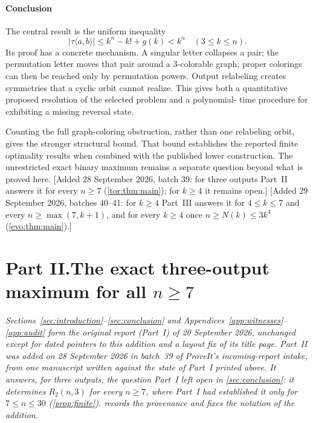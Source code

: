 \documentclass[11pt,a4paper]{article}
\numberwithin{equation}{section}
\theoremstyle{definition}
\theoremstyle{remark}
\begin{document}
\subsection{Conclusion}

The central result is the uniform inequality
\[
 \boxed{\ |\tau\langle a,b\rangle|\le k^n-k!+g(k)<k^n
          \quad(3\le k\le n).\ }
\]
Its proof has a concrete mechanism. A singular letter collapses a pair; the
permutation letter moves that pair around a $3$-colorable graph; proper
colorings can then be reached only by permutation powers. Output relabeling
creates symmetries that a cyclic orbit cannot realize. This gives both a
quantitative proposed resolution of the selected problem and a polynomial-
time procedure for exhibiting a missing reversal state.

Counting the full graph-coloring obstruction, rather than one relabeling
orbit, gives the stronger structural bound. That bound establishes the
reported finite optimality results when combined with the published lower
construction. The unrestricted exact binary maximum remains a separate
question beyond what is proved here.
[Added 28 September 2026, batch 39: for three outputs Part~II answers it for
every $n\ge7$ (\cref{tor:thm:main}); for $k\ge4$ it remains open.]
[Added 29 September 2026, batches 40--41: for $k\ge4$ Part~III answers it for $4\le k\le7$ and every
$n\ge\max(7,k+1)$, and for every $k\ge4$ once $n\ge N(k)\le3k^4$
(\cref{evo:thm:main}).]

\clearpage
{}\part*{Part II.\quad The exact three-output maximum for all $n\ge7$}

\noindent\emph{Sections~\ref{sec:introduction}--\ref{sec:conclusion} and
Appendices~\ref{app:witnesses}--\ref{app:audit} form the original report
(Part~I) of 20 September 2026, unchanged except for dated pointers to this
addition and a layout fix of its title page. Part~II was added on
28 September 2026 in batch~39 of ProveIt's incoming-report intake, from one
manuscript written against the state of Part~I printed above. It answers,
for three outputs, the question Part~I left open in \cref{sec:conclusion}:
it determines $R_2(n,3)$ for every $n\ge7$, where Part~I had established
it only for $7\le n\le30$ (\cref{prop:finite}).  records
the provenance and fixes the notation of the addition.}
\end{document}
